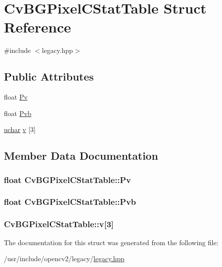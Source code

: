 \hypertarget{structCvBGPixelCStatTable}{\section{Cv\-B\-G\-Pixel\-C\-Stat\-Table Struct Reference}
\label{structCvBGPixelCStatTable}
}


{\ttfamily \#include $<$legacy.\-hpp$>$}

\subsection*{Public Attributes}
\begin{DoxyCompactItemize}
\item 
float \hyperlink{structCvBGPixelCStatTable_a14f1fb525af3cb098284bd2242e6c81e}{Pv}
\item 
float \hyperlink{structCvBGPixelCStatTable_a29a8d4255e9a9820edcfc0b953554938}{Pvb}
\item 
\hyperlink{core_2types__c_8h_a65f85814a8290f9797005d3b28e7e5fc}{uchar} \hyperlink{structCvBGPixelCStatTable_a19bb4ebea98266474001967c364c2fec}{v} \mbox{[}3\mbox{]}
\end{DoxyCompactItemize}


\subsection{Member Data Documentation}
\hypertarget{structCvBGPixelCStatTable_a14f1fb525af3cb098284bd2242e6c81e}{
\subsubsection[{Pv}]{\setlength{\rightskip}{0pt plus 5cm}float Cv\-B\-G\-Pixel\-C\-Stat\-Table\-::\-Pv}}\label{structCvBGPixelCStatTable_a14f1fb525af3cb098284bd2242e6c81e}
\hypertarget{structCvBGPixelCStatTable_a29a8d4255e9a9820edcfc0b953554938}{
\subsubsection[{Pvb}]{\setlength{\rightskip}{0pt plus 5cm}float Cv\-B\-G\-Pixel\-C\-Stat\-Table\-::\-Pvb}}\label{structCvBGPixelCStatTable_a29a8d4255e9a9820edcfc0b953554938}
\hypertarget{structCvBGPixelCStatTable_a19bb4ebea98266474001967c364c2fec}{
\subsubsection[{v}]{ Cv\-B\-G\-Pixel\-C\-Stat\-Table\-::v\mbox{[}3\mbox{]}}}\label{structCvBGPixelCStatTable_a19bb4ebea98266474001967c364c2fec}


The documentation for this struct was generated from the following file\-:\begin{DoxyCompactItemize}
\item 
/usr/include/opencv2/legacy/\hyperlink{legacy_8hpp}{legacy.\-hpp}\end{DoxyCompactItemize}
